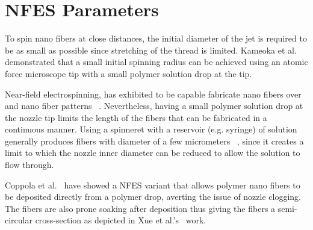 \documentclass[5p,,preprint,12pt,twocolumn]{elsarticle}
\begin{document}
\section{NFES Parameters}
To spin nano fibers at close distances, the initial diameter of the jet is required to be as small as possible since stretching of the thread is limited. Kameoka et al.\unskip~\cite{527120:12321556} demonstrated that a small initial spinning radius can be achieved using an atomic force microscope tip with a small polymer solution drop at the tip.

Near-field electrospinning, has exhibited to be capable fabricate nano fibers over and nano fiber patterns \unskip~\cite{527120:11974321}. Nevertheless, having a small polymer solution drop at the nozzle tip limits the length of the fibers that can be fabricated in a continuous manner. Using a spinneret with a reservoir (e.g. syringe) of solution generally produces fibers with diameter of a few micrometers \unskip~\cite{527120:11974310,527120:11974326}, since it creates a limit to which the nozzle inner diameter can be reduced to allow the solution to flow through.

Coppola et al.\unskip~\cite{527120:11974307} have showed a NFES variant that allows polymer nano fibers to be deposited directly from a polymer drop, averting the issue of nozzle clogging. The fibers are also prone soaking after deposition thus giving the fibers a semi-circular cross-section as depicted in Xue et al.'s\unskip~\cite{527120:11974326} work. 
\end{document}
